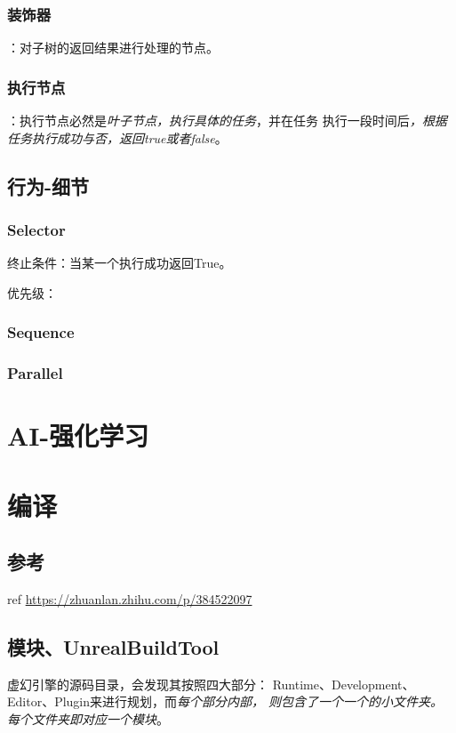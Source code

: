\documentclass[UTF8,a4paper,12pt]{ctexbook}
\begin{document}
		\subsection{装饰器}：对子树的返回结果进行处理的节点。	
		
		\subsection{执行节点}：执行节点必然是\textit{叶子节点，执行具体的任务}，并在任务 执行一段时间后\textit{，根据任务执行成功与否，返回true或者false}。
	
	
	\section{行为-细节}
		\subsection{Selector}
			终止条件：当某一个执行成功返回True。
			
			优先级：
		
		\subsection{Sequence}
			
		
		\subsection{Parallel}
		
		

\chapter{AI-强化学习}	





\chapter{编译}
	\section{参考}
		ref \url{https://zhuanlan.zhihu.com/p/384522097}

	\section{模块、UnrealBuildTool}
		虚幻引擎的源码目录，会发现其按照四大部分： Runtime、Development、Editor、Plugin来进行规划，而\textit{每个部分内部， 则包含了一个一个的小文件夹。每个文件夹即对应一个模块}。
		
\end{document}
